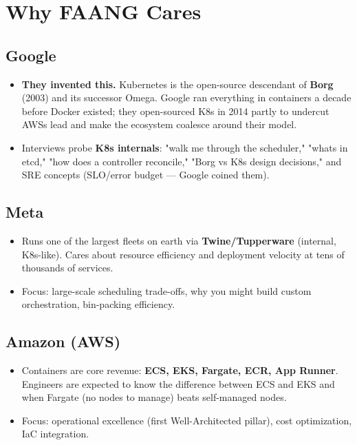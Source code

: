 \documentclass[11pt]{article}
\providecommand{\tightlist}{\setlength{\itemsep}{1pt}\setlength{\parskip}{0pt}}
\begin{document}
\section{Why FAANG Cares}\label{why-faang-cares}

\subsection{Google}\label{google}

\begin{itemize}
\tightlist
\item
  \textbf{They invented this.} Kubernetes is the open-source descendant of \textbf{Borg} (2003) and its successor Omega. Google ran everything in containers a decade before Docker existed; they open-sourced K8s in 2014 partly to undercut AWS\textquotesingle s lead and make the ecosystem coalesce around their model.
\item
  Interviews probe \textbf{K8s internals}: "walk me through the scheduler," "what\textquotesingle s in etcd," "how does a controller reconcile," "Borg vs K8s design decisions," and SRE concepts (SLO/error budget --- Google coined them).
\end{itemize}

\subsection{Meta}\label{meta}

\begin{itemize}
\tightlist
\item
  Runs one of the largest fleets on earth via \textbf{Twine/Tupperware} (internal, K8s-like). Cares about resource efficiency and deployment velocity at tens of thousands of services.
\item
  Focus: large-scale scheduling trade-offs, why you might build custom orchestration, bin-packing efficiency.
\end{itemize}

\subsection{Amazon (AWS)}\label{amazon-aws}

\begin{itemize}
\tightlist
\item
  Containers are core revenue: \textbf{ECS, EKS, Fargate, ECR, App Runner}. Engineers are expected to know the difference between ECS and EKS and when Fargate (no nodes to manage) beats self-managed nodes.
\item
  Focus: operational excellence (first Well-Architected pillar), cost optimization, IaC integration.
\end{itemize}
\end{document}

